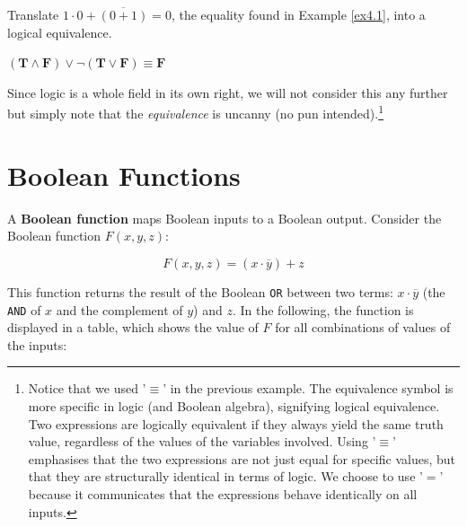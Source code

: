 \begin{example}
    Translate $1 \cdot 0+\overline{(0+1)}=0$, the equality found in Example \ref{ex4.1}, into a logical equivalence.

    \begin{solution}
        $(\mathbf{T} \wedge \mathbf{F}) \vee \neg(\mathbf{T} \vee \mathbf{F}) \equiv \mathbf{F}$
    \end{solution}
    
\end{example}

Since logic is a whole field in its own right, we will not consider this any further but simply note that the \textit{equivalence} is uncanny (no pun intended).\footnote{Notice that we used '$\equiv$' in the previous example. The equivalence symbol is more specific in logic (and Boolean algebra), signifying logical equivalence. Two expressions are logically equivalent if they always yield the same truth value, regardless of the values of the variables involved. Using '$\equiv$' emphasises that the two expressions are not just equal for specific values, but that they are structurally identical in terms of logic. We choose to use '$=$' because it communicates that the expressions behave identically on all inputs.}

\section{Boolean Functions}

A \textbf{Boolean function} maps Boolean inputs to a Boolean output. Consider the Boolean function $F(x, y, z)$:

\[
F(x, y, z) = (x \cdot \overline{y}) + z
\]

This function returns the result of the Boolean \texttt{OR} between two terms: $x \cdot \overline{y}$ (the \texttt{AND} of $x$ and the complement of $y$) and $z$. In the following, the function is displayed in a table, which shows the value of $F$ for all combinations of values of the inputs:

